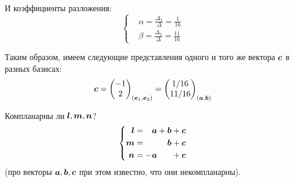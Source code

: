 \documentclass[a4paper,12pt]{article}
\begin{document}
\begin{solution}
    И коэффициенты разложения:
    \[
      \left\{
        \begin{aligned}
          &\alpha = \frac{\Delta_1}{\Delta} = \frac{1}{16}\\
          &\beta = \frac{\Delta_2}{\Delta} = \frac{11}{16}
        \end{aligned}
      \right.
    \]
    
    Таким образом, имеем следующие представления одного и того же вектора $\boldsymbol c$ в разных базисах:
    \[
      \boldsymbol c = \begin{pmatrix}
        -1 \\ 2
      \end{pmatrix}_{(\boldsymbol e_1, \boldsymbol e_2)}
      = \begin{pmatrix}
        1/16 \\ 11/16
      \end{pmatrix}_{(\boldsymbol a, \boldsymbol b)}
    \]
  \end{solution}
  

  \begin{problem}[1.11(2)]
    Компланарны ли $\boldsymbol l, \boldsymbol m, \boldsymbol n$?
    \begin{equation}
      \label{eq:problem1.11}
      \left\{
        \begin{aligned}
          \bds l &= \hphantom{-}\bds a + \bds b + \bds c\\
          \bds m &= \hphantom{-\bds a + {}} \bds b + \bds c\\
          \bds n &= -\bds a \hphantom{{} + \bds b} + \bds c
        \end{aligned}
      \right.
    \end{equation}
    (про векторы $\boldsymbol a, \boldsymbol b, \boldsymbol c$ при этом известно, что они некомпланарны).
  \end{problem}
  
\end{document}
